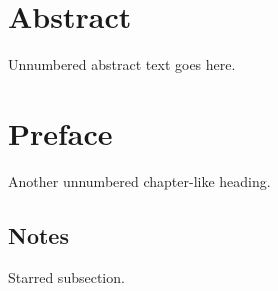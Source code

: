 \documentclass{article}
\begin{document}
\section*{Abstract}
Unnumbered abstract text goes here.
\section*{Preface}
Another unnumbered chapter-like heading.
\subsection*{Notes}
Starred subsection.
\end{document}
